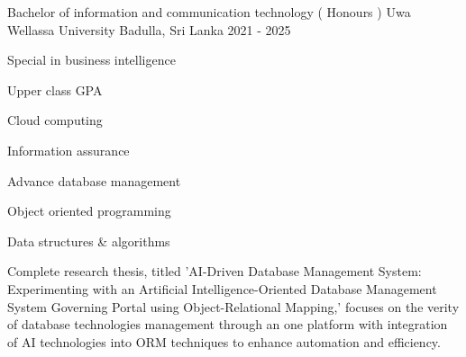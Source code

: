 

\begin{cventries}

  \cventry
    {Bachelor of information and communication technology ( Honours )} %
    {Uwa Wellassa University} %
    {Badulla, Sri Lanka} %
    {2021 - 2025} %
    {
      \begin{cvitems} %
        \item {Special in business intelligence }
        \item {Upper class GPA}
        \item {Cloud computing}
        \item {Information assurance }
        \item {Advance database management}
        \item {Object oriented programming}
        \item {Data structures  &  algorithms}
        \item {Complete research thesis, titled 'AI-Driven Database Management System: Experimenting with an Artificial Intelligence-Oriented Database Management System Governing Portal using Object-Relational Mapping,' focuses on the verity of database technologies management through an one platform with integration of AI technologies into ORM techniques to enhance automation and efficiency.}
      \end{cvitems}
    }

\end{cventries}
